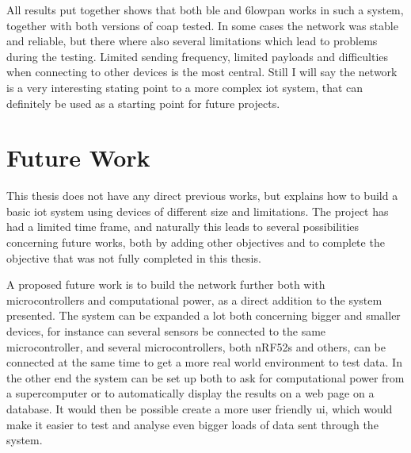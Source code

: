 \noindent All results put together shows that both \gls{ble} and \gls{6lowpan} works in such a system, together with both versions of \gls{coap} tested. In some cases the network was stable and reliable, but there where also several limitations which lead to problems during the testing. Limited sending frequency, limited payloads and difficulties when connecting to other devices is the most central. Still I will say the network is a very interesting stating point to a more complex \gls{iot} system, that can definitely be used as a starting point for future projects. 


\section{Future Work}

\noindent This thesis does not have any direct previous works, but explains how to build a basic \gls{iot} system using devices of different size and limitations. The project has had a limited time frame, and naturally this leads to several possibilities concerning future works, both by adding other objectives and to complete the objective that was not fully completed in this thesis. 

\noindent A proposed future work is to build the network further both with \glspl{microcontroller} and computational power, as a direct addition to the system presented. The system can be expanded a lot both concerning bigger and smaller devices, for instance can several sensors be connected to the same \gls{microcontroller}, and several \glspl{microcontroller}, both \glspl{nRF52} and others, can be connected at the same time to get a more real world environment to test data. In the other end the system can be set up both to ask for computational power from a supercomputer or to automatically display the results on a web page on a database. It would then be possible create a more user friendly \gls{ui}, which would make it easier to test and analyse even bigger loads of data sent through the system. 





